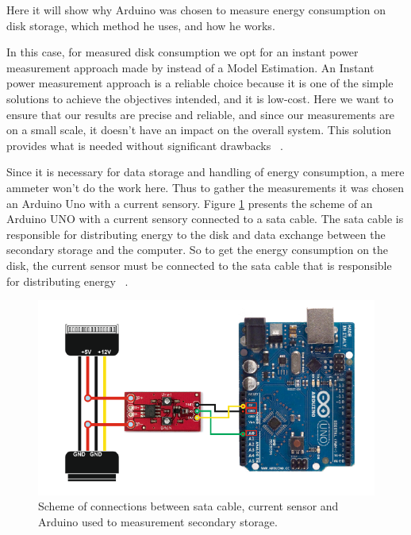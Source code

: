 \label{arduino}


Here it will show why Arduino was chosen to measure energy consumption on disk storage, which method he uses, and how he works.

In this case, for measured disk consumption we opt for an instant power measurement approach made by \citeauthor{portela2016} instead of a Model Estimation. An Instant power measurement approach is a reliable choice because it is one of the simple solutions to achieve the objectives intended, and it is low-cost. Here we want to ensure that our results are precise and reliable, and since our measurements are on a small scale, it doesn't have an impact on the overall system. This solution provides what is needed without significant drawbacks ~\cite{portela2016}.


Since it is necessary for data storage and handling of energy consumption, a mere ammeter won't do the work here. Thus to gather the measurements it was chosen an Arduino Uno with a current sensory. Figure \ref{fig:satacable} presents the scheme of an Arduino UNO with a current sensory connected to a \gls{sata} cable. The \gls{sata} cable is responsible for distributing energy to the disk and data exchange between the secondary storage and the computer.  So to get the energy consumption on the disk, the current sensor must be connected to the \gls{sata} cable that is responsible for distributing energy ~\cite{portela2016}.

\begin{figure}[H]
  \centering
  \includegraphics[width=0.8\columnwidth]{Chapters/images/arduino.png}  \caption{Scheme of connections between \gls{sata} cable, current sensor and Arduino used to measurement secondary storage.}
  \label{fig:satacable}
\end{figure}



